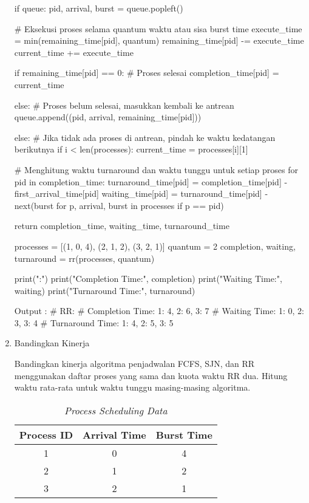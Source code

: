 \documentclass[12pt]{article}
\begin{document}
\begin{enumerate}
\begin{python}
        if queue:
            pid, arrival, burst = queue.popleft()
            
            # Eksekusi proses selama quantum waktu atau sisa burst time
            execute_time = min(remaining_time[pid], quantum)
            remaining_time[pid] -= execute_time
            current_time += execute_time

            if remaining_time[pid] == 0:  # Proses selesai
                completion_time[pid] = current_time
            
            else:  # Proses belum selesai, masukkan kembali ke antrean
                queue.append((pid, arrival, remaining_time[pid]))
        
        else:
            # Jika tidak ada proses di antrean, pindah ke waktu kedatangan berikutnya
            if i < len(processes):
                current_time = processes[i][1]  

    # Menghitung waktu turnaround dan waktu tunggu untuk setiap proses
    for pid in completion_time:
        turnaround_time[pid] = completion_time[pid] - first_arrival_time[pid]
        waiting_time[pid] = turnaround_time[pid] - next(burst for p, arrival, burst in processes if p == pid)

    return completion_time, waiting_time, turnaround_time

processes = [(1, 0, 4), (2, 1, 2), (3, 2, 1)]
quantum = 2
completion, waiting, turnaround = rr(processes, quantum)

print("\nRR:")
print("Completion Time:", completion)
print("Waiting Time:", waiting)
print("Turnaround Time:", turnaround)

Output : 
# RR:
# Completion Time: {1: 4, 2: 6, 3: 7}
# Waiting Time: {1: 0, 2: 3, 3: 4}
# Turnaround Time: {1: 4, 2: 5, 3: 5}
\end{python}
        
    \item Bandingkan Kinerja
        \par  Bandingkan kinerja algoritma penjadwalan FCFS, SJN, dan RR menggunakan daftar proses yang sama dan kuota waktu RR dua. Hitung waktu rata-rata untuk waktu tunggu masing-masing algoritma.
        \begin{table}[h!]
        \centering
        \begin{tabular}{|c|c|c|}
        \hline
        \textbf{Process ID} & \textbf{Arrival Time} & \textbf{Burst Time} \\ \hline
        1 & 0 & 4 \\ \hline
        2 & 1 & 2 \\ \hline
        3 & 2 & 1 \\ \hline
        \end{tabular}
        \caption{\textit{Process Scheduling Data}}
        \end{table}
        

\end{enumerate}
\end{document}
